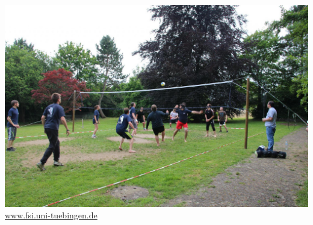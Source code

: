 \documentclass{beamer}
\begin{document}
	\begin{frame}
		\includegraphics[width=\linewidth]{volleyball_sofe15.jpg}
		\vspace*{2mm}\\
		{\centering\url{www.fsi.uni-tuebingen.de}}
	\end{frame}
\end{document}
